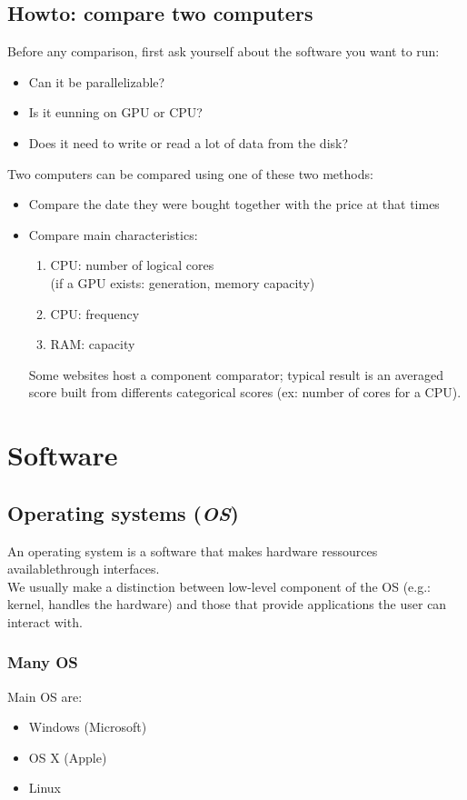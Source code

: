 \documentclass[11pt]{article}
\begin{document}
		\subsection{Howto: compare two computers}
			Before any comparison, first ask yourself about the software you want to run:
			\begin{itemize}
				\item Can it be parallelizable?
				\item Is it eunning on GPU or CPU?
				\item Does it need to write or read a lot of data from the disk?
			\end{itemize}
			Two computers can be compared using one of these two methods:
			\begin{itemize}
				\item Compare the date they were bought together with the price at that times
				\item Compare main characteristics:
				\begin{enumerate}
					\item CPU: number of logical cores \\
					(if a GPU exists: generation, memory capacity)
					\item CPU: frequency
					\item RAM: capacity
				\end{enumerate}
				Some websites host a component comparator; typical result is an averaged score built from differents categorical scores (ex: number of cores for a CPU).
			\end{itemize}


	\section{Software}

		\subsection{Operating systems (\textit{OS})}
			An operating system is a software that makes hardware ressources availablethrough interfaces. \\
			We usually make a distinction between low-level component of the OS (e.g.: kernel, handles the hardware) and those that provide
			applications the user can interact with. 

			\subsubsection{Many OS}
				Main OS are:
				\begin{itemize}
					\item Windows (Microsoft)
					\item OS X (Apple)
					\item Linux
				\end{itemize}
\end{document}
